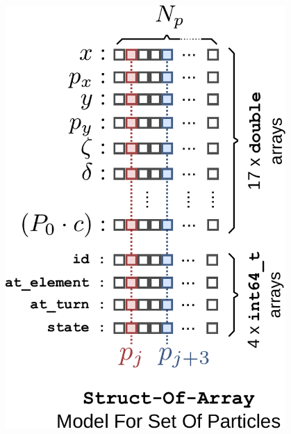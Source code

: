 \documentclass{beamer}
\begin{document}
\begin{frame}[t]
\begin{columns}
\begin{column}{0.4\textwidth}
\begin{figure}[H]
                \includegraphics[width=0.95\textwidth]{poster_images/fig_particle_model_baseline}
            \end{figure}
        \end{column}
    \end{columns}
\end{frame}
\end{document}
